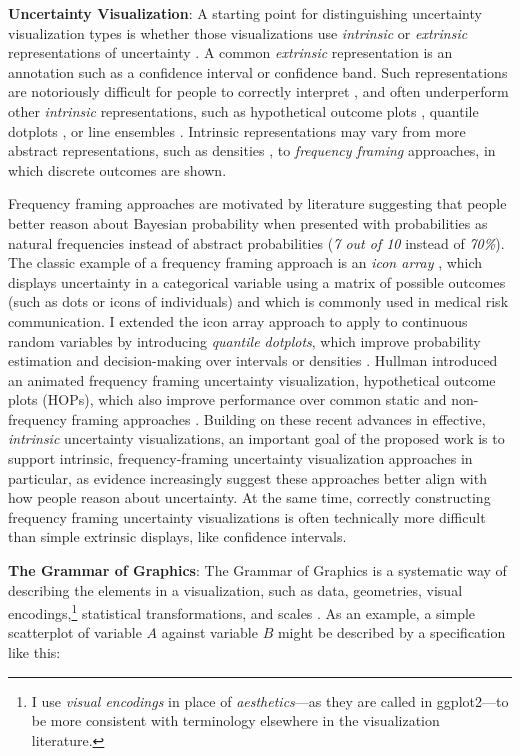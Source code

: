 \documentclass[11pt]{article}
\begin{document}
\noindent \textbf{Uncertainty Visualization}: A starting point for distinguishing uncertainty visualization types is whether those visualizations use \emph{intrinsic} or \emph{extrinsic} representations of uncertainty \cite{kay2016bus}. A common \emph{extrinsic} representation is an annotation such as a confidence interval or confidence band. Such representations are notoriously difficult for people to correctly interpret \cite{belia2005ci}, and often underperform other \emph{intrinsic} representations, such as hypothetical outcome plots \cite{hullman2015hops, kale2018hypothetical}, quantile dotplots \cite{kay2016bus, Fernandes2018}, or line ensembles \cite{padilla2017effects}. Intrinsic representations may vary from more abstract representations, such as densities \cite{Ibrekk1987}, to \emph{frequency framing} approaches, in which discrete outcomes are shown. 

Frequency framing approaches are motivated by literature suggesting that people better reason about Bayesian probability when presented with probabilities as natural frequencies instead of abstract probabilities \cite{Gigerenzer1995} (\eg \emph{7 out of 10} instead of \emph{70\%}). The classic example of a frequency framing approach is an \emph{icon array} \cite{Ancker2006}, which displays uncertainty in a categorical variable using a matrix of possible outcomes (such as dots or icons of individuals) and which is commonly used in medical risk communication. I extended the icon array approach to apply to continuous random variables by introducing \emph{quantile dotplots}, which improve probability estimation and decision-making over intervals or densities \cite{kay2016bus, kale2018hypothetical}. Hullman \etal introduced an animated frequency framing uncertainty visualization, hypothetical outcome plots (HOPs), which also improve performance over common static and non-frequency framing approaches \cite{hullman2015hops,kale2018hypothetical}. Building on these recent advances in effective, \emph{intrinsic} uncertainty visualizations, an important goal of the proposed work is to support intrinsic, frequency-framing uncertainty visualization approaches in particular, as evidence increasingly suggest these approaches better align with how people reason about uncertainty. At the same time, correctly constructing frequency framing uncertainty visualizations is often technically more difficult than simple extrinsic displays, like confidence intervals.

\noindent \textbf{The Grammar of Graphics}: The Grammar of Graphics is a systematic way of describing the elements in a visualization, such as data, geometries, visual encodings,\footnote{I use \emph{visual encodings} in place of \emph{aesthetics}---as they are called in ggplot2---to be more consistent with terminology elsewhere in the visualization literature.} statistical transformations, and scales \cite{wilkinson_grammar_2005, Wickham2010layered_grammar, wickham2016ggplot2}. As an example, a simple scatterplot of variable $A$ against variable $B$ might be described by a specification like this:
\end{document}
